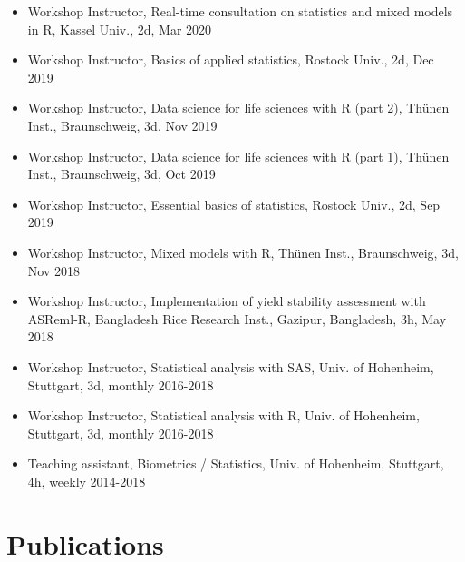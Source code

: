 \documentclass[11pt, a4paper]{awesome-cv}
\providecommand{\tightlist}{%
	\setlength{\itemsep}{0pt}\setlength{\parskip}{0pt}}
\newcounter{papers}
\begin{document}
\begin{itemize}
\tightlist
\item
  Workshop Instructor, Real-time consultation on statistics and mixed models in R, Kassel Univ., 2d, Mar 2020
\item
  Workshop Instructor, Basics of applied statistics, Rostock Univ., 2d, Dec 2019
\item
  Workshop Instructor, Data science for life sciences with R (part 2), Thünen Inst., Braunschweig, 3d, Nov 2019
\item
  Workshop Instructor, Data science for life sciences with R (part 1), Thünen Inst., Braunschweig, 3d, Oct 2019
\item
  Workshop Instructor, Essential basics of statistics, Rostock Univ., 2d, Sep 2019
\item
  Workshop Instructor, Mixed models with R, Thünen Inst., Braunschweig, 3d, Nov 2018
\item
  Workshop Instructor, Implementation of yield stability assessment with ASReml-R, Bangladesh Rice Research Inst., Gazipur, Bangladesh, 3h, May 2018
\item
  Workshop Instructor, Statistical analysis with SAS, Univ. of Hohenheim, Stuttgart, 3d, monthly 2016-2018
\item
  Workshop Instructor, Statistical analysis with R, Univ. of Hohenheim, Stuttgart, 3d, monthly 2016-2018
\item
  Teaching assistant, Biometrics / Statistics, Univ. of Hohenheim, Stuttgart, 4h, weekly 2014-2018
\end{itemize}

\hypertarget{publications}{%
\section{Publications}\label{publications}}

\newrefcontext[sorting=none]\setcounter{papers}{0}\pagebreak[3]
\printbibliography[category=bib-D:/Coding/CV/publications.bib-4297418,heading=none]\setcounter{papers}{0}

\nocite{buntaran2020cross,
kukowski2020auswirkungen,
schmidt2020estimating,
schmidt2019heritability,
schmidt2019estimating,
schmidt2018more,
tulinska2018humoral,
schmidt2017variability,
zeljenkova2016one}
\end{document}
